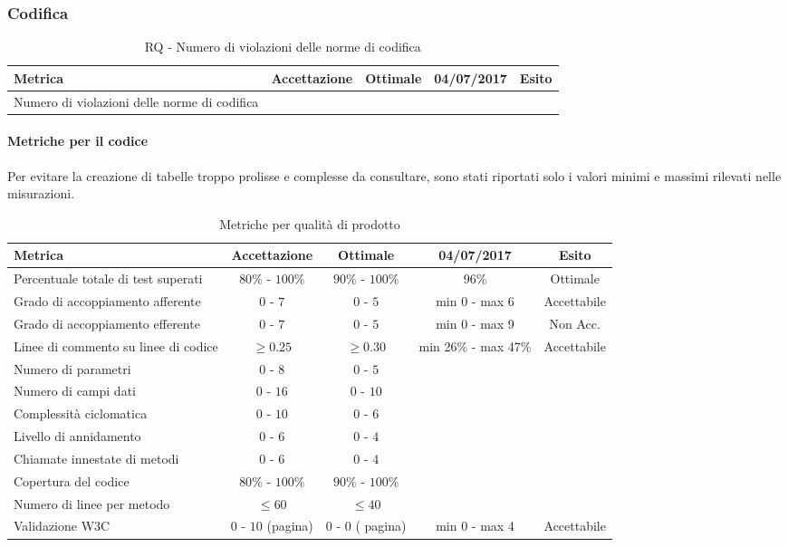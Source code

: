 \documentclass[../PianoDiQualifica.tex]{subfiles}
\begin{document}
				\subsubsection{Codifica}	\begin{table}[H]
					\center
					\begin{tabular}{|>{\centering}p{6cm}|c|c|c|c|}
						\hline
						\rowcolor{blue!30}\textbf{Metrica} & \textbf{Accettazione} & \textbf{Ottimale}&\textbf{04/07/2017}&\textbf{Esito} \\ \hline
						Numero di violazioni delle norme di codifica &  &  & &\\ \hline
						\end{tabular}
					\caption{RQ - Numero di violazioni delle norme di codifica}
					\end{table}
					\paragraph{Metriche per il codice\\}
						Per evitare la creazione di tabelle troppo prolisse e complesse da consultare,
						sono stati riportati solo i valori minimi e massimi rilevati nelle misurazioni.
							\begin{table}[H]
							\center
							\begin{tabular}{|>{\centering}p{6cm}|c|c|c|c|}
								\hline
								\rowcolor{blue!30}\textbf{Metrica} & \textbf{Accettazione} & \textbf{Ottimale}&\textbf{04/07/2017}&\textbf{Esito} \\ \hline
								Percentuale totale di test superati &$80\%$ - $100\%$&$90\%$ - $100\%$&96\%&Ottimale\\ \hline
								Grado di accoppiamento afferente&$0$ - $7$&$0$ - $5$&
								min 0 - max 6 &Accettabile\\ \hline
								Grado di accoppiamento efferente &$0$ - $7$&$0$ - $5$&min 0 - max 9 & Non Acc. \\ \hline
								Linee di commento su linee di codice &$\geq 0.25$& $\geq 0.30$ &min 26\% - max 47\% &Accettabile\\ \hline
								Numero di parametri &$0$ - $8$&$0$ - $5$&& \\ \hline
								Numero di campi dati &$0$ - $16$&$0$ - $10$&&\\ \hline
								Complessità ciclomatica &$0$ - $10$&$0$ - $6$ &&\\ \hline
								Livello di annidamento &$0$ - $6$&$0$ - $4$&&\\ \hline
								Chiamate innestate di metodi &$0$ - $6$&$0$ - $4$ &&\\ \hline
								Copertura del codice & $80\%$ - $100\%$&$90\%$ - $100\%$ &&\\ \hline
								Numero di linee per metodo & $\leq 60$ & $\leq 40$ &&\\ \hline
								Validazione W3C & $0$ - $10$ (pagina) & $0$ - $0$ ( pagina)& min 0 - max 4&Accettabile \\ \hline
							\end{tabular}
							\caption{Metriche per qualità di prodotto}
						\end{table}
\end{document}
